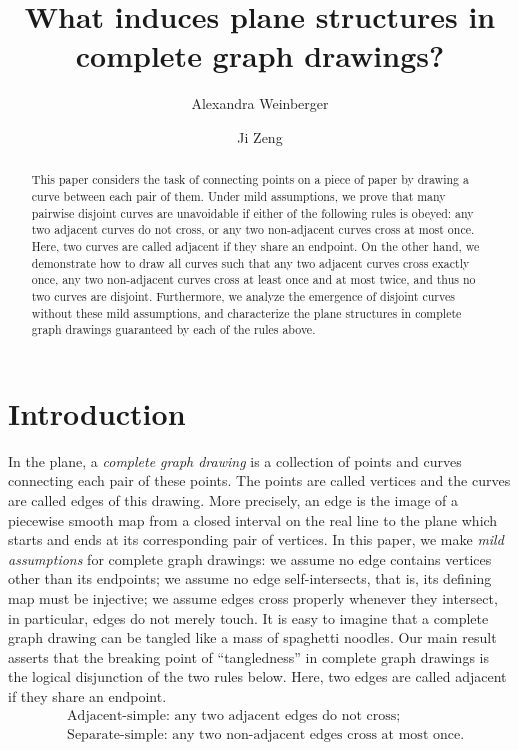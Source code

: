 \documentclass[a4paper,UKenglish,cleveref, autoref, thm-restate]{lipics_arxiv}
\author{Alexandra Weinberger}{FernUniversit\"at in Hagen, Germany}{alexandra.weinberger@fernuni-hagen.de}{https://orcid.org/0000-0001-8553-6661}{}%
\author{Ji Zeng}{Alfréd Rényi Institute of Mathematics, Hungary}{zeng.ji@renyi.hu}{https://orcid.org/0009-0002-7240-4832}{Supported by ERC Advanced Grants ``GeoScape'', no. 882971 and ``ERMiD'', no. 101054936, and also partly supported by NSF grant DMS-1928930 while in residence at the Simons--Laufer Mathematical Sciences Institute during the Spring 2025 semester.}
\title{What induces plane structures in complete graph drawings?}
\begin{document}
\maketitle

\begin{abstract}
This paper considers the task of connecting points on a piece of paper by drawing a curve between each pair of them. Under mild assumptions, we prove that many pairwise disjoint curves are unavoidable if either of the following rules is obeyed: any two adjacent curves do not cross, or any two non-adjacent curves cross at most once. Here, two curves are called adjacent if they share an endpoint.
On the other hand, we demonstrate how to draw all curves such that any two adjacent curves cross exactly once, any two non-adjacent curves cross at least once and at most twice, and thus no two curves are disjoint.
Furthermore, we analyze the emergence of disjoint curves without these mild assumptions, and characterize the plane structures in complete graph drawings guaranteed by each of the rules above.
\end{abstract}

\section{Introduction}\label{sec:introduction}
In the plane, a \textit{complete graph drawing} is a collection of points and curves connecting each pair of these points. The points are called vertices and the curves are called edges of this drawing. More precisely, an edge is the image of a piecewise smooth map from a closed interval on the real line to the plane which starts and ends at its corresponding pair of vertices. In this paper, we make \textit{mild assumptions} for complete graph drawings: we assume no edge contains vertices other than its endpoints; we assume no edge self-intersects, that is, its defining map must be injective; we assume edges cross properly whenever they intersect, in particular, edges do not merely touch. It is easy to imagine that a complete graph drawing can be tangled like a mass of spaghetti noodles. Our main result asserts that the breaking point of ``tangledness'' in complete graph drawings is the logical disjunction of the two rules below. Here, two edges are called adjacent if they share an endpoint.
\begin{equation*}
    \begin{aligned}
    &\text{Adjacent-simple: any two adjacent edges do not cross;}\\
    &\text{Separate-simple: any two non-adjacent edges cross at most once.}
\end{aligned}
\end{equation*}
\end{document}
